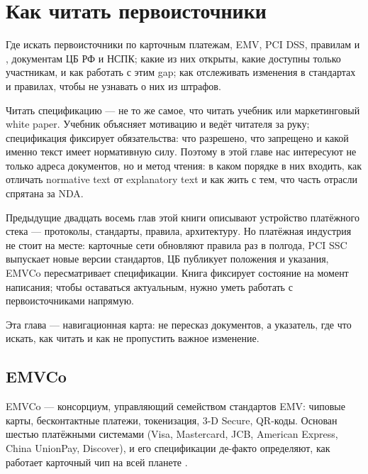 \chapter{Как читать первоисточники}
\label{ch:primary-sources}
\margintoc


\begin{kaobox}[title=Что вы узнаете из этой главы]
  Где искать первоисточники по карточным платежам, EMV,
  PCI DSS, правилам  и ,
  документам ЦБ РФ и НСПК; какие из них открыты, какие
  доступны только участникам, и как работать с этим gap;
  как отслеживать изменения в стандартах и правилах,
  чтобы не узнавать о них из штрафов.
\end{kaobox}

Читать спецификацию — не то же самое, что читать учебник или
маркетинговый white paper. Учебник объясняет мотивацию и ведёт
читателя за руку; спецификация фиксирует обязательства: что разрешено,
что запрещено и какой именно текст имеет нормативную силу. Поэтому
в этой главе нас интересуют не только адреса документов, но и метод
чтения: в каком порядке в них входить, как отличать normative text
от explanatory text и как жить с тем, что часть отрасли спрятана
за NDA.

Предыдущие двадцать восемь глав этой книги описывают
устройство платёжного стека — протоколы, стандарты, правила,
архитектуру. Но платёжная индустрия не стоит на месте:
карточные сети обновляют правила раз в полгода, PCI SSC
выпускает новые версии стандартов, ЦБ публикует положения
и указания, EMVCo пересматривает спецификации. Книга фиксирует
состояние на момент написания; чтобы оставаться актуальным,
нужно уметь работать с первоисточниками напрямую.

Эта глава — навигационная карта: не пересказ документов,
а указатель, где что искать, как читать и как не пропустить
важное изменение.

\section{EMVCo}
\label{sec:ps-emvco}

EMVCo — консорциум, управляющий семейством стандартов EMV: чиповые карты, бесконтактные платежи, токенизация, 3-D
Secure, QR-коды. Основан шестью платёжными системами (Visa, Mastercard, JCB, American Express, China UnionPay,
Discover), и его спецификации де-факто определяют, как работает карточный чип на всей планете .

